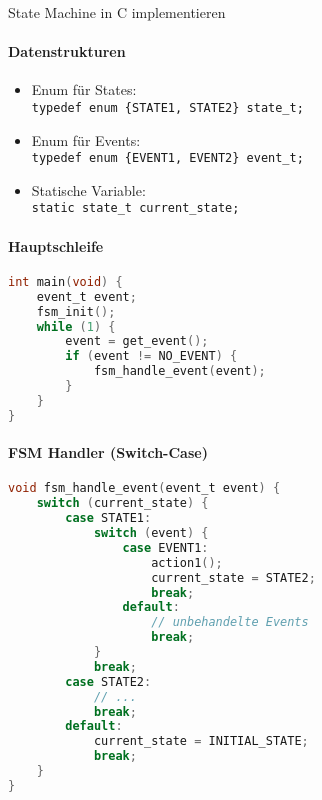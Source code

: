 \begin{KR}{State Machine in C implementieren}

    \begin{minipage}{0.45\linewidth}
    \paragraph{Datenstrukturen}
    \begin{itemize}
        \item Enum für States: \\ \texttt{typedef enum \{STATE1, STATE2\} state\_t;}
        \item Enum für Events: \\ \texttt{typedef enum \{EVENT1, EVENT2\} event\_t;}
        \item Statische Variable: \\ \texttt{static state\_t current\_state;}
    \end{itemize}
    \vspace{5mm}
    \paragraph{Hauptschleife}
\begin{lstlisting}[language=C, style=basesmol]
int main(void) {
    event_t event;
    fsm_init();
    while (1) {
        event = get_event();
        if (event != NO_EVENT) {
            fsm_handle_event(event);
        }
    }
}
\end{lstlisting}
    \end{minipage}
    \hspace{4mm}
    \begin{minipage}{0.5\linewidth}
    \paragraph{FSM Handler (Switch-Case)}
\begin{lstlisting}[language=C, style=basesmol]
void fsm_handle_event(event_t event) {
    switch (current_state) {
        case STATE1:
            switch (event) {
                case EVENT1:
                    action1();
                    current_state = STATE2;
                    break;
                default:
                    // unbehandelte Events
                    break;
            }
            break;
        case STATE2:
            // ...
            break;
        default:
            current_state = INITIAL_STATE;
            break;
    }
}
\end{lstlisting}
\end{minipage}


\end{KR}
